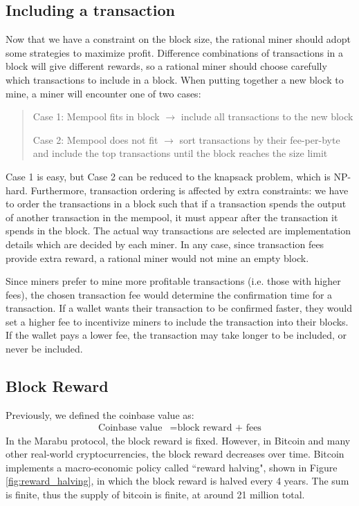 \subsection{Including a transaction}
Now that we have a constraint on the block size, the rational miner should adopt some strategies to maximize profit. Difference combinations of transactions in a block will give different rewards, so a rational miner should choose carefully which transactions to include in a block. When putting together a new block to mine, a miner will encounter one of two cases:

\begin{quote}
    Case 1: Mempool fits in block $\longrightarrow$ include all transactions to the new block

    Case 2: Mempool does not fit $\longrightarrow$ sort transactions by their fee-per-byte and include the top transactions until the block reaches the size limit
\end{quote}

Case 1 is easy, but Case 2 can be reduced to the knapsack problem, which is NP-hard. Furthermore, transaction ordering is affected by extra constraints: we have to order the transactions in a block such that if a transaction spends the output of another transaction in the mempool, it must appear after the transaction it spends in the block. The actual way transactions are selected are implementation details which are decided by each miner. In any case, since transaction fees provide extra reward, a rational miner would not mine an empty block.

Since miners prefer to mine more profitable transactions (i.e. those with higher fees), the chosen transaction fee would determine the confirmation time for a transaction. If a wallet wants their transaction to be confirmed faster, they would set a higher fee to incentivize miners to include the transaction into their blocks. If the wallet pays a lower fee, the transaction may take longer to be included, or never be included.

\subsection{Block Reward}
Previously, we defined the coinbase value as:
\begin{align*}
    \text{Coinbase value} &= \text{block reward + fees}
\end{align*}
In the Marabu protocol, the block reward is fixed. However, in Bitcoin and many other real-world cryptocurrencies, the block reward decreases over time. Bitcoin implements a macro-economic policy called ``reward halving", shown in Figure \ref{fig:reward_halving}, in which the block reward is halved every 4 years. The sum is finite, thus the supply of bitcoin is finite, at around 21 million total.

